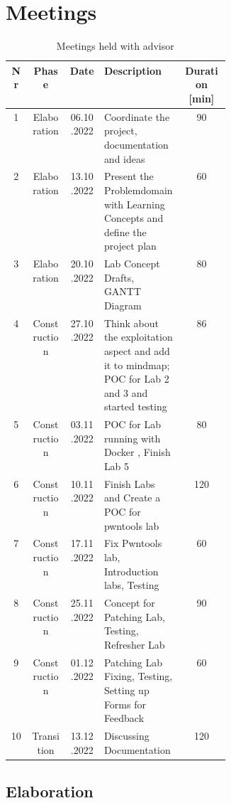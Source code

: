 \chapter*{Meetings}
\label{meeting_chapter}

\begin{table}[H]
    \centering
    \begin{tabular}{| c | c | c | p{0.36\linewidth} | c |}
        \hline 
        Nr & Phase & Date & Description & Duration [min]\\
        \hline \hline
        1 & Elaboration & 06.10.2022 & Coordinate the project, documentation \- and ideas & 90\\
        \hline
        2 & Elaboration & 13.10.2022 & Present the Problemdomain with Learning Concepts and define the project plan & 60 \\
        \hline
        3 & Elaboration & 20.10.2022 & Lab Concept Drafts, GANTT Diagram & 80 \\
        \hline
        4 & Construction & 27.10.2022 & Think about the exploitation aspect and add it to mindmap; POC for Lab 2 and 3 and started testing & 86\\
        \hline
        5 & Construction & 03.11.2022 & POC for Lab running with Docker , Finish Lab 5 & 80 \\
        \hline
        6 & Construction & 10.11.2022 & Finish Labs and Create a POC for pwntools lab & 120 \\
        \hline
        7 & Construction & 17.11.2022 & Fix Pwntools lab, Introduction labs, Testing & 60 \\
        \hline
        8 & Construction & 25.11.2022 & Concept for Patching Lab, Testing, Refresher Lab & 90 \\
        \hline
        9 & Construction & 01.12.2022 & Patching Lab Fixing, Testing, Setting up Forms for Feedback & 60 \\
        \hline
        10 & Transition & 13.12.2022 & Discussing Documentation & 120 \\
        \hline
    \end{tabular}
    \caption{Meetings held with advisor}
    \label{meetings_hold_table}
\end{table}
\section*{Elaboration}

